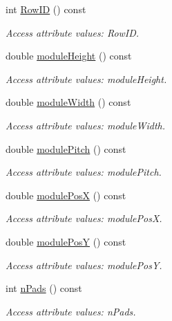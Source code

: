 \begin{DoxyCompactItemize}
int \hyperlink{struct_d_d4hep_1_1_x_m_l_1_1_child_value_a813be3b9906b204e33517a4c78847561}{Row\+ID} () const
\begin{DoxyCompactList}\small\item\em Access attribute values\+: Row\+ID. \end{DoxyCompactList}\item 
double \hyperlink{struct_d_d4hep_1_1_x_m_l_1_1_child_value_a038f0530e65d9c64493ab084d26b96f4}{module\+Height} () const
\begin{DoxyCompactList}\small\item\em Access attribute values\+: module\+Height. \end{DoxyCompactList}\item 
double \hyperlink{struct_d_d4hep_1_1_x_m_l_1_1_child_value_a8c5322e4bfb7e568a109ec5c08bfa8e9}{module\+Width} () const
\begin{DoxyCompactList}\small\item\em Access attribute values\+: module\+Width. \end{DoxyCompactList}\item 
double \hyperlink{struct_d_d4hep_1_1_x_m_l_1_1_child_value_a6a72ee5cbfa882b2a73ef8acddce79ca}{module\+Pitch} () const
\begin{DoxyCompactList}\small\item\em Access attribute values\+: module\+Pitch. \end{DoxyCompactList}\item 
double \hyperlink{struct_d_d4hep_1_1_x_m_l_1_1_child_value_a43ac24a1b5435ce33cdbed08d4069a4f}{module\+PosX} () const
\begin{DoxyCompactList}\small\item\em Access attribute values\+: module\+PosX. \end{DoxyCompactList}\item 
double \hyperlink{struct_d_d4hep_1_1_x_m_l_1_1_child_value_add07af0e51b3c0a48ee336ea59d7e4b1}{module\+PosY} () const
\begin{DoxyCompactList}\small\item\em Access attribute values\+: module\+PosY. \end{DoxyCompactList}\item 
int \hyperlink{struct_d_d4hep_1_1_x_m_l_1_1_child_value_a50ff0a8b88c168c4c555da8cbe0bdca8}{n\+Pads} () const
\begin{DoxyCompactList}\small\item\em Access attribute values\+: n\+Pads. \end{DoxyCompactList}\item 

\end{DoxyCompactItemize}

